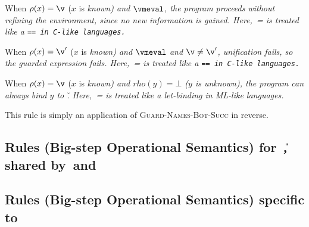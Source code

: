 \documentclass[manuscript,screen 12pt, nonacm]{acmart}
\begin{document}
\guardnameexpeq

When $\rho(x) = \v$ ($x$ is \it{known}) and $\vmeval$, the program proceeds
without refining the environment, since no new information is gained.
Here,~\it{=} is treated like a \tt{==} in C-like languages. 

\guardnameexpfail

When $\rho(x) = \v'$ ($x$ is \it{known}) and $\vmeval$ and $\v \neq \v'$,
unification fails, so the guarded expression fails. Here,~\it{=} is treated like
a \tt{==} in C-like languages. 

\guardnamesbotsucc

When $\rho(x) = \v$ ($x$ is \it{known}) and $rho(y) = \bot$ ($y$ is
\it{unknown}), the program can always bind $y$ to \v. Here,~\it{=} is treated
like a let-binding in ML-like languages. 


\guardnamesbotsuccrev

This rule is simply an application of \textsc{Guard-Names-Bot-Succ} in reverse. 
    
    \vfilbreak
    
    \subsection{Rules (Big-step Operational Semantics) for~\U, shared by~\VMinus and~\D}
    \label{usemantics1}
    \usemantics 
    \subsection{Rules (Big-step Operational Semantics) specific to~\VMinus}
    \label{vmsemantics}
    \vmsemantics
\end{document}
